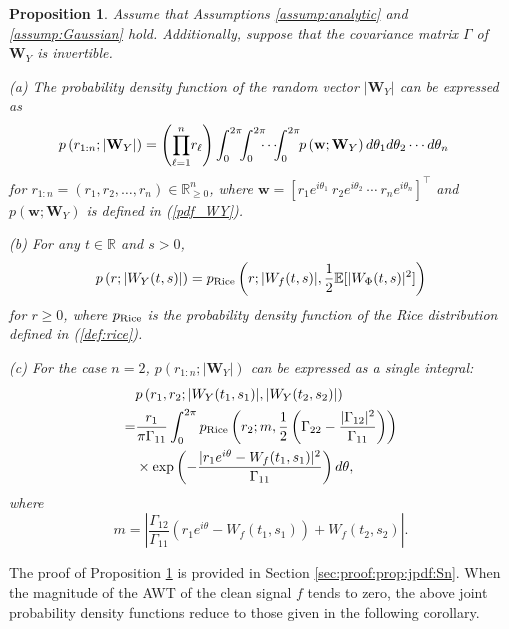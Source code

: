 \documentclass{amsart}
\newtheorem{Proposition}{Proposition}
\begin{document}
\begin{Proposition}\label{prop:jpdf:Sn}
Assume that Assumptions \ref{assump:analytic} and \ref{assump:Gaussian} hold.
Additionally,
suppose that the covariance matrix $\Gamma$ of $\mathbf{W}_{Y}$
is invertible.


(a) The probability density function of the random vector $|\mathbf{W}_{Y}|$
can be expressed as
\begin{align}\label{jpdf:|WY|:n:nonnull}
&p\left(r_{1:n};|\mathbf{W}_{Y}|\right)
=\left(\overset{n}{\underset{\ell=1}{\prod}}r_{\ell}\right)\int_{0}^{2\pi}\hspace{-0.15cm}\int_{0}^{2\pi}\hspace{-0.2cm}\cdots \hspace{-0.15cm}\int_{0}^{2\pi}
\hspace{-0.1cm} p\left(\mathbf{w};\mathbf{W}_{Y}\right)d\theta_{1}d\theta_{2}\cdots d\theta_{n}
\end{align}
for $r_{1:n}=(r_{1},r_{2},\ldots,r_{n})\in \mathbb{R}_{\geq 0}^{n}$, where
$\mathbf{w}=[ r_{1}e^{i\theta_{1}} \  r_{2}e^{i\theta_{2}} \  \cdots \  r_{n}e^{i\theta_{n}}]^{\top}$
and $p\left(\mathbf{w};\mathbf{W}_{Y}\right)$ is defined in
(\ref{pdf_WY}).


(b) For any $t\in \mathbb{R}$ and $s>0$,
\begin{align*}
p\left(r;|W_{Y}(t,s)|\right)
=p_{\textup{Rice}}\left(r;|W_{f}(t,s)|,\frac{1}{2}\mathbb{E}[|W_{\Phi}(t,s)|^{2}]\right)
\end{align*}
for $r\geq0$, where $p_{\textup{Rice}}$ is the probability density function of the Rice distribution defined in (\ref{def:rice}).


(c) For the case $n=2$,  $p\left(r_{1:n};|\mathbf{W}_{Y}|\right)$ can be expressed as a single integral:
\begin{align}\notag
&p\left(r_{1},r_{2}; |W_{Y}(t_{1},s_{1})|,|W_{Y}(t_{2},s_{2})|\right)
\\\notag=&\frac{r_{1}}{\pi\Gamma_{11}}\int_{0}^{2\pi}
 p_{\textup{Rice}}\left(r_{2};m,
\frac{1}{2}\left(\Gamma_{22}-\frac{|\Gamma_{12}|^{2}}{\Gamma_{11}}\right)\right)
\\\label{jpdf:|WY|:n=2:nonnull}&\times\textup{exp}\left(-\frac{|r_{1}e^{i\theta}-W_{f}(t_{1},s_{1})|^{2}}{\Gamma_{11}}\right)d\theta,
\end{align}
where
$$
m=\left|\frac{\Gamma_{12}}{\Gamma_{11}}\left(r_{1}e^{i\theta}-W_{f}(t_{1},s_{1})\right)
+W_{f}(t_{2},s_{2})\right|.
$$
\end{Proposition}
The proof of Proposition \ref{prop:jpdf:Sn} is provided in Section \ref{sec:proof:prop:jpdf:Sn}.
When the magnitude of the AWT of the clean signal $f$ tends to zero, the above joint probability density functions reduce to those given in the following corollary.
\end{document}

